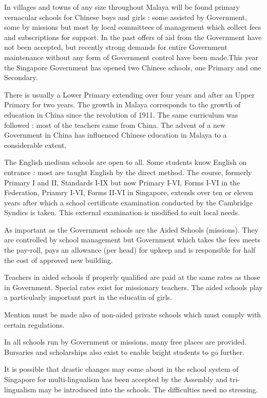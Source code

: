 In villages and towns of any size throughout Malaya will be found primary vernacular schools for Chinese boys and girls : some assisted by Government, some by missions but most by local committees of management which collect fees and subscriptions for support. In the past offers of aid from the Government have not been accepted, but recently strong demands for entire Government maintenance without any form of Government control have been made.\pageoriginale This year the Singapore Government has opened two Chinese schools, one Primary and one Secondary.

There is usually a Lower Primary extending over four years and after an Upper Primary for two years. The growth in Malaya corresponds to the growth of education in China since the revolution of 1911. The same curriculum was followed : most of the teachers came from China. The advent of a new Government in China has influenced Chinese education in Malaya to a considerable extent.

The English medium schools are open to all. Some students know English on entrance : most are taught English by the direct method. The course, formerly Primary I and II, Standards I-IX but now Primary I-VI, Forms I-VI in the Federation, Priamry I-VI, Forms II-VI in Singapore, extends over ten or eleven years after which a school certificate examination conducted by the Cambridge Syndics is taken. This external examination is modified to suit local needs.

As important as the Government schools are the Aided Schools (missions). They are controlled by school management but Government which takes the fees meets the pay-roll, pays an allowance (per head) for upkeep and is responsible for half the cost of approved new building.

Teachers in aided schools if properly qualified are paid at the same rates as those in Government. Special rates exist for missionary teachers. The aided schools play a particularly important part in the educatin of girls.

Mention must be made also of non-aided private schools which must comply with certain regulations.

In all schools run by Government or missions, many free places are provided. Bursaries and scholarships also exist to enable bright students to go further.

It is possible that drastic changes may come about in the school system of Singapore for multi-lingualism has been accepted by the Assembly and tri-lingualism may be introduced into the schools. The difficulties need no stressing.

